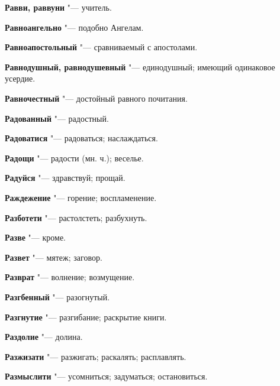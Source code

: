 \begin{mymulticols}{2}
\noindent\textbf{Равви, раввуни} "--- учитель. 




\noindent\textbf{Равноангельно} "--- подобно Ангелам. 




\noindent\textbf{Равноапостольный} "--- сравниваемый с апостолами. 




\noindent\textbf{Равнодушный, равнодушевный} "--- единодушный; имеющий одинаковое усердие. 




\noindent\textbf{Равночестный} "--- достойный равного почитания. 




\noindent\textbf{Радованный} "--- радостный. 




\noindent\textbf{Радоватися} "--- радоваться; наслаждаться. 




\noindent\textbf{Радощи} "--- радости (мн. ч.); веселье. 




\noindent\textbf{Радуйся} "--- здравствуй; прощай. 




\noindent\textbf{Раждежение} "--- горение; воспламенение. 




\noindent\textbf{Разботети} "--- растолстеть; разбухнуть. 




\noindent\textbf{Разве} "--- кроме. 




\noindent\textbf{Развет} "--- мятеж; заговор. 




\noindent\textbf{Разврат} "--- волнение; возмущение. 




\noindent\textbf{Разгбенный} "--- разогнутый. 




\noindent\textbf{Разгнутие} "--- разгибание; раскрытие книги. 




\noindent\textbf{Раздолие} "--- долина. 




\noindent\textbf{Разжизати} "--- разжигать; раскалять; расплавлять. 




\noindent\textbf{Размыслити} "--- усомниться; задуматься; остановиться. 





\end{mymulticols}
